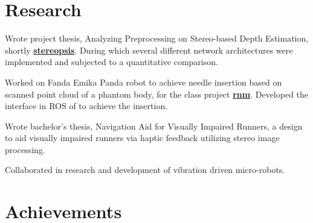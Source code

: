 \documentclass[]{resume}
\begin{document}
\begin{minipage}[t]{0.66\textwidth}
\begin{minipage}[t]{0.90\textwidth}

		\section{Research}

		\begin{tightemize}
			\item Wrote project thesis, Analyzing Preprocessing on Stereo-based Depth Estimation, shortly \textbf{\href{https://github.com:octaskin/stereopsis}{stereopsis}}. During which several different network architectures were implemented and subjected to a quantitative comparison.
			\item Worked on Fanda Emika Panda robot to achieve needle insertion based on scanned point cloud of a phantom body, for the class project \textbf{\href{https://github.com/octaskin/rnm}{rnm}}. Developed the interface in ROS of to achieve the insertion.
		\end{tightemize}
		\sectionsep

		\begin{tightemize}
			\item Wrote bachelor's thesis, Navigation Aid for Visually Impaired Runners, a design to aid visually impaired runners via haptic feedback utilizing stereo image processing.
			\item Collaborated in research and development of vibration driven micro-robots.
		\end{tightemize}
		\sectionsep



		\vspace{-3pt}

		\section{Achievements}


\end{minipage}
\end{minipage}
\end{document}
